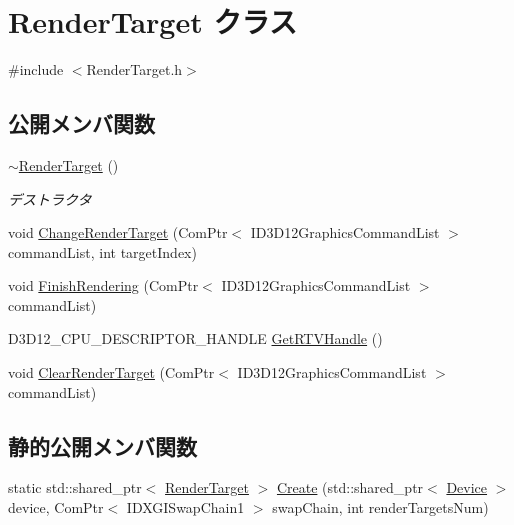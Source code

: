 \hypertarget{class_render_target}{}\section{Render\+Target クラス}
\label{class_render_target}


{\ttfamily \#include $<$Render\+Target.\+h$>$}

\subsection*{公開メンバ関数}
\begin{DoxyCompactItemize}
\item 
\mbox{\hyperlink{class_render_target_a5c8ef0f2c9e46ed80e5e3ce6e5567b8b}{$\sim$\+Render\+Target}} ()
\begin{DoxyCompactList}\small\item\em デストラクタ \end{DoxyCompactList}\item 
void \mbox{\hyperlink{class_render_target_a49d0110b24e7a80b5c61838776d8be3d}{Change\+Render\+Target}} (Com\+Ptr$<$ I\+D3\+D12\+Graphics\+Command\+List $>$ command\+List, int target\+Index)
\item 
void \mbox{\hyperlink{class_render_target_a182c92e3d7cb77dba1485b4471bd22c8}{Finish\+Rendering}} (Com\+Ptr$<$ I\+D3\+D12\+Graphics\+Command\+List $>$ command\+List)
\item 
D3\+D12\+\_\+\+C\+P\+U\+\_\+\+D\+E\+S\+C\+R\+I\+P\+T\+O\+R\+\_\+\+H\+A\+N\+D\+LE \mbox{\hyperlink{class_render_target_a170c383af63b5919a45965d719db1acb}{Get\+R\+T\+V\+Handle}} ()
\item 
void \mbox{\hyperlink{class_render_target_aa3d82758fcf16a3546289a813f42c654}{Clear\+Render\+Target}} (Com\+Ptr$<$ I\+D3\+D12\+Graphics\+Command\+List $>$ command\+List)
\end{DoxyCompactItemize}
\subsection*{静的公開メンバ関数}
\begin{DoxyCompactItemize}
\item 
static std\+::shared\+\_\+ptr$<$ \mbox{\hyperlink{class_render_target}{Render\+Target}} $>$ \mbox{\hyperlink{class_render_target_a3867ed895640f96c911ad7da3cd3e1d0}{Create}} (std\+::shared\+\_\+ptr$<$ \mbox{\hyperlink{class_device}{Device}} $>$ device, Com\+Ptr$<$ I\+D\+X\+G\+I\+Swap\+Chain1 $>$ swap\+Chain, int render\+Targets\+Num)
\end{DoxyCompactItemize}
